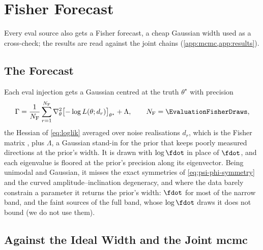 \section{Fisher Forecast}
\label{app:fisher}

Every eval source also gets a Fisher forecast, a cheap Gaussian width used as a cross-check; the results
are read against the joint chains (\cref{app:mcmc,app:results}).

\subsection{The Forecast}
\label{app:evaluation-fisher}\label{app:fisher-forecast}

Each eval injection gets a Gaussian centred at the truth $\theta^\star$ with precision
\begin{equation}
  \Gamma = \frac1{N_{\rm F}}\sum_{r=1}^{N_{\rm F}}\nabla^2_\theta\bigl[-\log L(\theta; d_r)\bigr]_{\theta^\star}
  + \Lambda,
  \qquad N_{\rm F} = \EvaluationFisherDraws,
  \label{eq:evaluation-fisher}
\end{equation}
the Hessian of \cref{eq:loglik} averaged over noise realisations $d_r$, which is the Fisher matrix
\citep{cutler1994gravitational,vallisneri2008use}, plus $\Lambda$, a Gaussian stand-in for the prior that keeps
poorly measured directions at the prior's width. It is drawn with $\log\fdot$ in place of $\fdot$, and each
eigenvalue is floored at the prior's precision along its eigenvector. Being unimodal and Gaussian, it misses
the exact symmetries of \cref{eq:psi-phi-symmetry} and the curved amplitude--inclination degeneracy, and where
the data barely constrain a parameter it returns the prior's width: $\fdot$ for most of the narrow band, and
the faint sources of the full band, whose $\log\fdot$ draws it does not bound (we do not use them).

\subsection{Against the Ideal Width and the Joint \acs{mcmc}}
\label{app:mcmc-fisher}\label{app:fisher-ideal}

